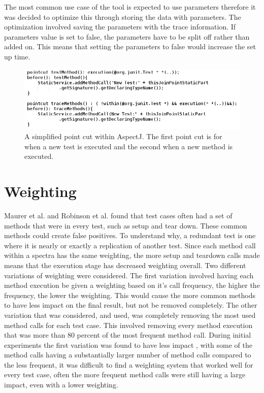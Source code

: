 The most common use case of the tool is expected to use parameters therefore it was decided to optimize this through storing the data with parameters. The optimization involved saving the parameters with the trace information. If parameters value is set to false, the parameters have to be split off rather than added on. This means that setting the parameters to false would increase the set up time.

\begin{figure}[h]
\begin{center}
\includegraphics[width = \textwidth]{aspect.png}
\end{center}
\caption{A simplified point cut within AspectJ. The first point cut is for when a new test is executed and the second when a new method is executed.}
\label{fig:aspectused}
\end{figure}

\section{Weighting}
Maurer et al. \cite{koochakzadeh2009test} and Robinson et al. \cite{li2008static} found that test cases often had a set of methods that were in every test, such as setup and tear down. These common methods could create false positives. To understand why, a redundant test is one where it is nearly or exactly a replication of another test. Since each method call within a spectra has the same weighting, the more setup and teardown calls made means that the execution stage has decreased weighting overall. Two different variations of weighting were considered. The first variation involved having each method execution be given a weighting based on it's call frequency, the higher the frequency, the lower the weighting. This would cause the more common methods to have less impact on the final result, but not be removed completely. The other variation that was considered, and used, was completely removing the most used method calls for each test case. This involved removing every method execution that was more than 80 percent of the most frequent method call. During initial experiments the first variation was found to have less impact , with some of the method calls having a substantially larger number of method calls compared to the less frequent, it was difficult to find a weighting system that worked well for every test case, often the more frequent method calls were still having a large impact, even with a lower weighting.

